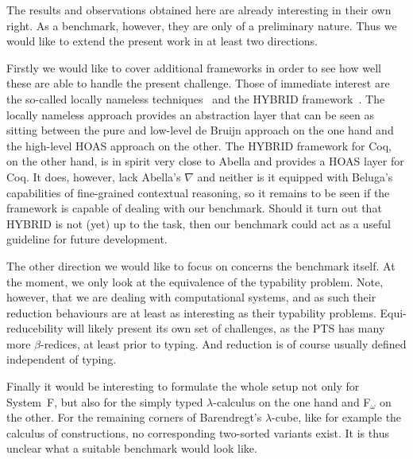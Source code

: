 \documentclass[a4paper,UKenglish]{lipics-v2016}
\begin{document}
The results and observations obtained here are already interesting in their own right.
As a benchmark, however, they are only of a preliminary nature.
Thus we would like to extend the present work in at least two directions.

Firstly we would like to cover additional frameworks in order to see how well these are able to handle the present challenge.
Those of immediate interest are the so-called locally nameless techniques~\cite{DBLP:conf/popl/AydemirCPPW08} and the HYBRID framework~\cite{Capretta2007, Capretta2009, DBLP:journals/jar/FeltyM12}.
The locally nameless approach provides an abstraction layer that can be seen as sitting between the pure and low-level de Bruijn approach on the one hand and the high-level HOAS approach on the other.
The HYBRID framework for Coq, on the other hand, is in spirit very close to Abella and provides a HOAS layer for Coq.
It does, however, lack Abella's $\nabla$ and neither is it equipped with Beluga's capabilities of fine-grained contextual reasoning, so it remains to be seen if the framework is capable of dealing with our benchmark.
Should it turn out that HYBRID is not (yet) up to the task, then our benchmark could act as a useful guideline for future development.

The other direction we would like to focus on concerns the benchmark itself.
At the moment, we only look at the equivalence of the typability problem.
Note, however, that we are dealing with computational systems, and as such their reduction behaviours are at least as interesting as their typability problems.
Equi-reducebility will likely present its own set of challenges, as the PTS has many more $\beta$-redices, at least prior to typing.
And reduction is of course usually defined independent of typing.

Finally it would be interesting to formulate the whole setup not only for System~F, but also for the simply typed $\lambda$-calculus on the one hand and F$_\omega$ on the other.
For the remaining corners of Barendregt's $\lambda$-cube, like for example the calculus of constructions, no corresponding two-sorted variants exist.
It is thus unclear what a suitable benchmark would look like.










\end{document}
